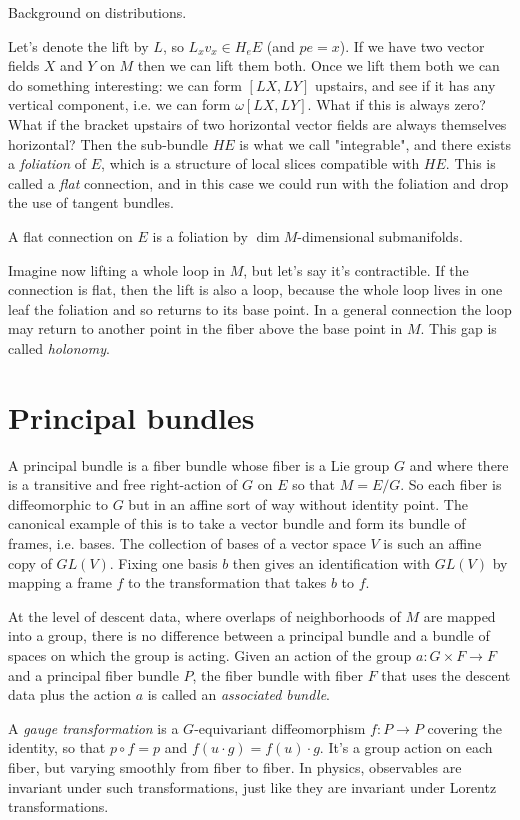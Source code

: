 \documentclass[12pt]{article}
\begin{document}
Background on distributions.

Let's denote the lift by $L$, so $L_x v_x\in H_e E$ (and $pe=x$). If we have two vector fields $X$ and $Y$ on $M$ then we can lift them both. Once we lift them both we can do something interesting: we can form $[LX, LY]$ upstairs, and see if it has any vertical component, i.e. we can form $\omega[LX, LY]$. What if this is always zero? What if the bracket upstairs of two horizontal vector fields are always themselves horizontal? Then the sub-bundle $HE$ is what we call "integrable", and there exists a \emph{foliation} of $E$, which is a structure of local slices compatible with $HE$. This is called a \emph{flat} connection, and in this case we could run with the foliation and drop the use of tangent bundles.

A flat connection on $E$ is a foliation by $\dim M$-dimensional submanifolds.

Imagine now lifting a whole loop in $M$, but let's say it's contractible. If the connection is flat, then the lift is also a loop, because the whole loop lives in one leaf the foliation and so returns to its base point. In a general connection the loop may return to another point in the fiber above the base point in $M$. This gap is called \emph{holonomy}. 

\section{Principal bundles}
A principal bundle is a fiber bundle whose fiber is a Lie group $G$ and where there is a transitive and free right-action of $G$ on $E$ so that $M = E/G$. So each fiber is diffeomorphic to $G$ but in an affine sort of way without identity point. The canonical example of this is to take a vector bundle and form its bundle of frames, i.e. bases. The collection of bases of a vector space $V$ is such an affine copy of $GL(V)$. Fixing one basis $b$ then gives an identification with $GL(V)$ by mapping a frame $f$ to the transformation that takes $b$ to $f$.

At the level of descent data, where overlaps of neighborhoods of $M$ are mapped into a group, there is no difference between a principal bundle and a bundle of spaces on which the group is acting. Given an action of the group $a:G\times F\to F$ and a principal fiber bundle $P$, the fiber bundle with fiber $F$ that uses the descent data plus the action $a$ is called an \emph{associated bundle}.

A \emph{gauge transformation} is a $G$-equivariant diffeomorphism $f:P\to P$ covering the identity, so that $p\circ f = p$ and $f(u\cdot g) = f(u)\cdot g$. It's a group action on each fiber, but varying smoothly from fiber to fiber. In physics, observables are invariant under such transformations, just like they are invariant under Lorentz transformations.
\end{document}
